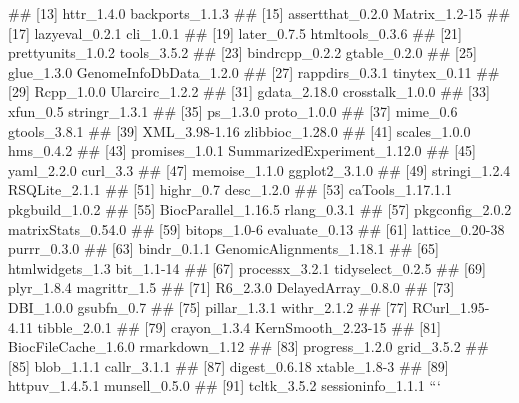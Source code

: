 ## [13] httr_1.4.0                  backports_1.1.3            
## [15] assertthat_0.2.0            Matrix_1.2-15              
## [17] lazyeval_0.2.1              cli_1.0.1                  
## [19] later_0.7.5                 htmltools_0.3.6            
## [21] prettyunits_1.0.2           tools_3.5.2                
## [23] bindrcpp_0.2.2              gtable_0.2.0               
## [25] glue_1.3.0                  GenomeInfoDbData_1.2.0     
## [27] rappdirs_0.3.1              tinytex_0.11               
## [29] Rcpp_1.0.0                  Ularcirc_1.2.2             
## [31] gdata_2.18.0                crosstalk_1.0.0            
## [33] xfun_0.5                    stringr_1.3.1              
## [35] ps_1.3.0                    proto_1.0.0                
## [37] mime_0.6                    gtools_3.8.1               
## [39] XML_3.98-1.16               zlibbioc_1.28.0            
## [41] scales_1.0.0                hms_0.4.2                  
## [43] promises_1.0.1              SummarizedExperiment_1.12.0
## [45] yaml_2.2.0                  curl_3.3                   
## [47] memoise_1.1.0               ggplot2_3.1.0              
## [49] stringi_1.2.4               RSQLite_2.1.1              
## [51] highr_0.7                   desc_1.2.0                 
## [53] caTools_1.17.1.1            pkgbuild_1.0.2             
## [55] BiocParallel_1.16.5         rlang_0.3.1                
## [57] pkgconfig_2.0.2             matrixStats_0.54.0         
## [59] bitops_1.0-6                evaluate_0.13              
## [61] lattice_0.20-38             purrr_0.3.0                
## [63] bindr_0.1.1                 GenomicAlignments_1.18.1   
## [65] htmlwidgets_1.3             bit_1.1-14                 
## [67] processx_3.2.1              tidyselect_0.2.5           
## [69] plyr_1.8.4                  magrittr_1.5               
## [71] R6_2.3.0                    DelayedArray_0.8.0         
## [73] DBI_1.0.0                   gsubfn_0.7                 
## [75] pillar_1.3.1                withr_2.1.2                
## [77] RCurl_1.95-4.11             tibble_2.0.1               
## [79] crayon_1.3.4                KernSmooth_2.23-15         
## [81] BiocFileCache_1.6.0         rmarkdown_1.12             
## [83] progress_1.2.0              grid_3.5.2                 
## [85] blob_1.1.1                  callr_3.1.1                
## [87] digest_0.6.18               xtable_1.8-3               
## [89] httpuv_1.4.5.1              munsell_0.5.0              
## [91] tcltk_3.5.2                 sessioninfo_1.1.1
```


